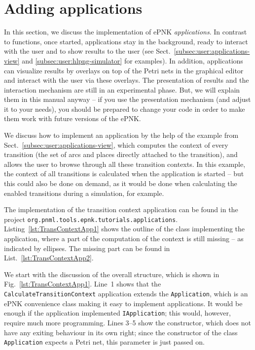 \section{Adding applications}
\label{subsec:developer:applications}

In this section, we discuss the implementation of ePNK \emph{applications}.
In contrast to functions, once started, applications stay in the background,
ready to interact with the user and to show results to the user
(see Sect.~\ref{subsec:user:applications-view} and \ref{subsec:user:hlpng-simulator}
for examples). In addition, applications can visualize results by overlays
on top of the Petri nets in the graphical editor and interact with the user
via these overlays.
The presentation of results and the interaction mechanism are still
in an experimental phase. But, we will explain them in this manual anyway --
if you use the presentation mechanism (and adjust it to your needs), you
should be prepared to change your code in order to make them work with future
versions of the ePNK.

We discuss how to implement an application by the help of the
example from Sect.~\ref{subsec:user:applications-view}, which computes the
context of every transition (the set of arcs and places directly attached to the
transition), and allows the user to browse through all these transition
contexts. In this example, the context of all transitions is calculated when the
application is started -- but this could also be done on demand, as it would be
done when calculating the enabled transitions during a simulation, for example.

The implementation of the transition context application can be found
in the project {\tt org.pnml.tools.epnk.tutorials.applications}.
Listing~\ref{lst:TransContextApp1} shows the outline of the class implementing
the application, where a part of the computation of the context is still missing
-- as indicated by ellipses. The missing part can be found in
List.~\ref{lst:TransContextApp2}.

We start with the discussion of the overall structure, which is shown in
Fig.~\ref{lst:TransContextApp1}. Line~1 shows that the {\tt CalculateTransitionContext}
application extends the {\tt Application}, which is an ePNK convenience class
making it easy to implement applications. It would be enough if the application
implemented {\tt IApplication}; this would, however, require much more programming.
Lines 3--5 show the constructor, which does not have any exiting behaviour in
its own right; since the constructor of the class {\tt Application} expects a
Petri net, this parameter is just passed on.

